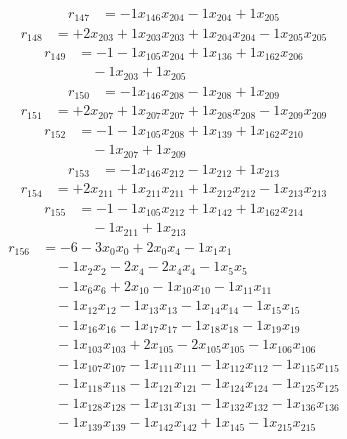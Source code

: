 \[\begin{aligned}
r_{147} &= - 1 x_{146} x_{204} - 1 x_{204} + 1 x_{205}
\end{aligned}\]
\[\begin{aligned}
r_{148} &= + 2 x_{203} + 1 x_{203} x_{203} + 1 x_{204} x_{204} - 1 x_{205} x_{205}
\end{aligned}\]
\[\begin{aligned}
r_{149} &= - 1 - 1 x_{105} x_{204} + 1 x_{136} + 1 x_{162} x_{206} \\
 &\quad - 1 x_{203} + 1 x_{205}
\end{aligned}\]
\[\begin{aligned}
r_{150} &= - 1 x_{146} x_{208} - 1 x_{208} + 1 x_{209}
\end{aligned}\]
\[\begin{aligned}
r_{151} &= + 2 x_{207} + 1 x_{207} x_{207} + 1 x_{208} x_{208} - 1 x_{209} x_{209}
\end{aligned}\]
\[\begin{aligned}
r_{152} &= - 1 - 1 x_{105} x_{208} + 1 x_{139} + 1 x_{162} x_{210} \\
 &\quad - 1 x_{207} + 1 x_{209}
\end{aligned}\]
\[\begin{aligned}
r_{153} &= - 1 x_{146} x_{212} - 1 x_{212} + 1 x_{213}
\end{aligned}\]
\[\begin{aligned}
r_{154} &= + 2 x_{211} + 1 x_{211} x_{211} + 1 x_{212} x_{212} - 1 x_{213} x_{213}
\end{aligned}\]
\[\begin{aligned}
r_{155} &= - 1 - 1 x_{105} x_{212} + 1 x_{142} + 1 x_{162} x_{214} \\
 &\quad - 1 x_{211} + 1 x_{213}
\end{aligned}\]
\[\begin{aligned}
r_{156} &= - 6 - 3 x_{0} x_{0} + 2 x_{0} x_{4} - 1 x_{1} x_{1} \\
 &\quad - 1 x_{2} x_{2} - 2 x_{4} - 2 x_{4} x_{4} - 1 x_{5} x_{5} \\
 &\quad - 1 x_{6} x_{6} + 2 x_{10} - 1 x_{10} x_{10} - 1 x_{11} x_{11} \\
 &\quad - 1 x_{12} x_{12} - 1 x_{13} x_{13} - 1 x_{14} x_{14} - 1 x_{15} x_{15} \\
 &\quad - 1 x_{16} x_{16} - 1 x_{17} x_{17} - 1 x_{18} x_{18} - 1 x_{19} x_{19} \\
 &\quad - 1 x_{103} x_{103} + 2 x_{105} - 2 x_{105} x_{105} - 1 x_{106} x_{106} \\
 &\quad - 1 x_{107} x_{107} - 1 x_{111} x_{111} - 1 x_{112} x_{112} - 1 x_{115} x_{115} \\
 &\quad - 1 x_{118} x_{118} - 1 x_{121} x_{121} - 1 x_{124} x_{124} - 1 x_{125} x_{125} \\
 &\quad - 1 x_{128} x_{128} - 1 x_{131} x_{131} - 1 x_{132} x_{132} - 1 x_{136} x_{136} \\
 &\quad - 1 x_{139} x_{139} - 1 x_{142} x_{142} + 1 x_{145} - 1 x_{215} x_{215}
\end{aligned}\]
